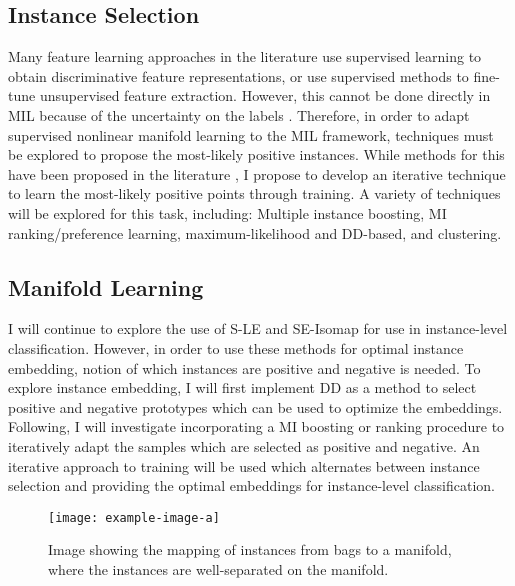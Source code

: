 \subsection{Instance Selection}
Many feature learning approaches in the literature use supervised learning to obtain discriminative feature representations, or use supervised methods to fine-tune unsupervised  feature extraction.  However, this cannot be done directly in MIL because of the uncertainty on the labels \citep{Carbonneau2016MILSurvey}.  Therefore, in order to adapt supervised nonlinear manifold learning to the MIL framework, techniques must be explored to propose the most-likely positive instances.  While methods for this have been proposed in the literature \citep{Kim2010LocalDRMIL, Maron1998DiverseDensity, Bocinsky2019SPIEMIACEInitialization}, I propose to develop an iterative technique to learn the most-likely positive points through training.  A variety of techniques will be explored for this task, including: Multiple instance boosting, MI ranking/preference learning, maximum-likelihood and DD-based, and clustering.  

\subsection{Manifold Learning}
I will continue to explore the use of S-LE and SE-Isomap for use in instance-level classification.  However, in order to use these methods for optimal instance embedding, notion of which instances are positive and negative is needed.  To explore instance  embedding, I will first implement DD as a method to select positive and negative prototypes which can be used to optimize the embeddings.  Following, I will investigate incorporating a MI boosting or ranking procedure to iteratively adapt the samples which are selected as positive and negative.  An iterative approach to training will be used which alternates between instance selection and providing the optimal embeddings for instance-level classification.

\begin{center}
	\begin{figure*}[h]
		\centering
		\texttt{[image: example-image-a]}
		\caption[Proposed manifold learning]{Image showing the mapping of instances from bags to a manifold, where the instances are well-separated  on the manifold.}
		\label{fig:proposed_manifold_learning}
	\end{figure*}
\end{center}

